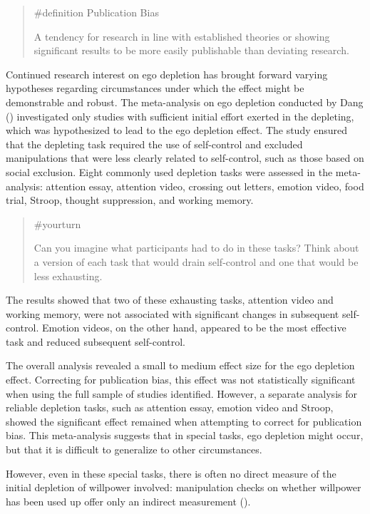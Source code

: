 \documentclass[
  letterpaper,
]{book}
\begin{document}
\begin{quote}
{\#definition} Publication Bias

A tendency for research in line with established theories or showing
significant results to be more easily publishable than deviating
research.
\end{quote}

Continued research interest on ego depletion has brought forward varying
hypotheses regarding circumstances under which the effect might be
demonstrable and robust. The meta-analysis on ego depletion conducted by
Dang () investigated only studies with
sufficient initial effort exerted in the depleting, which was
hypothesized to lead to the ego depletion effect. The study ensured that
the depleting task required the use of self-control and excluded
manipulations that were less clearly related to self-control, such as
those based on social exclusion. Eight commonly used depletion tasks
were assessed in the meta-analysis: attention essay, attention video,
crossing out letters, emotion video, food trial, Stroop, thought
suppression, and working memory.

\begin{quote}
{\#yourturn}

Can you imagine what participants had to do in these tasks? Think about
a version of each task that would drain self-control and one that would
be less exhausting.
\end{quote}

The results showed that two of these exhausting tasks, attention video
and working memory, were not associated with significant changes in
subsequent self-control. Emotion videos, on the other hand, appeared to
be the most effective task and reduced subsequent self-control.

The overall analysis revealed a small to medium effect size for the ego
depletion effect. Correcting for publication bias, this effect was not
statistically significant when using the full sample of studies
identified. However, a separate analysis for reliable depletion tasks,
such as attention essay, emotion video and Stroop, showed the
significant effect remained when attempting to correct for publication
bias. This meta-analysis suggests that in special tasks, ego depletion
might occur, but that it is difficult to generalize to other
circumstances.

However, even in these special tasks, there is often no direct measure
of the initial depletion of willpower involved: manipulation checks on
whether willpower has been used up offer only an indirect measurement
().
\end{document}
